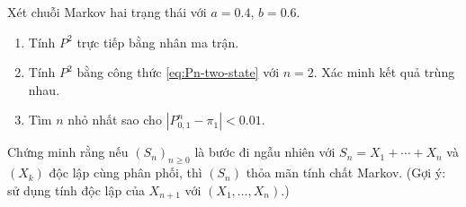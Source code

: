 \begin{exercise}
Xét chuỗi Markov hai trạng thái với $a = 0.4$, $b = 0.6$.
\begin{enumerate}[label=(\alph*)]
  \item Tính $P^2$ trực tiếp bằng nhân ma trận.
  \item Tính $P^2$ bằng công thức \eqref{eq:Pn-two-state} với $n = 2$. Xác minh kết quả trùng nhau.
  \item Tìm $n$ nhỏ nhất sao cho $|P^n_{0,1} - \pi_1| < 0.01$.
\end{enumerate}
\end{exercise}

\begin{exercise}
Chứng minh rằng nếu $(S_n)_{n\geq 0}$ là bước đi ngẫu nhiên với $S_n = X_1 + \cdots + X_n$
và $(X_k)$ độc lập cùng phân phối, thì $(S_n)$ thỏa mãn tính chất Markov.
(Gợi ý: sử dụng tính độc lập của $X_{n+1}$ với $(X_1, \ldots, X_n)$.)
\end{exercise}

